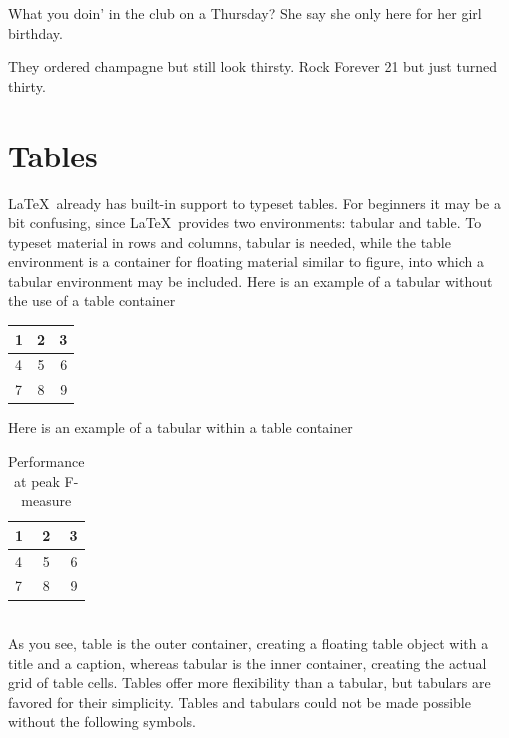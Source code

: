 \documentclass[12pt,journal,compsoc]{IEEEtran}
\begin{document}
What you doin' in the club on a Thursday?
She say she only here for her girl birthday. \par
They ordered champagne but still look thirsty.
Rock Forever 21 but just turned thirty.


\section{Tables}
\LaTeX\ already has built-in support to typeset tables.
For beginners it may be a bit confusing, since \LaTeX\
provides two environments: tabular and table. To
typeset material in rows and columns, tabular is
needed, while the table environment is a container
for floating material similar to figure, into which a
tabular environment may be included. Here is an example of a tabular without the use of a table container 

\begin{center}
  \begin{tabular}{ | l | c | r | }
    \hline
    1 & 2 & 3 \\ \hline
    4 & 5 & 6 \\ \hline
    7 & 8 & 9 \\ 
    \hline
  \end{tabular}
\end{center}

Here is an example of a tabular within a table container

\begin{table}[h]\footnotesize
  \caption{Performance at peak F-measure}
  \begin{center}
  \begin{tabular}{ | l | c | r | }
    \hline
    1 & 2 & 3 \\ \hline
    4 & 5 & 6 \\ \hline
    7 & 8 & 9 \\ 
    \hline
  \end{tabular}
\end{center}
\end{table} \\

As you see, table is the outer container, creating a floating table object with a title and a caption, whereas tabular is the inner container, creating the actual grid of table cells. Tables offer more flexibility than a tabular, but tabulars are  favored for their simplicity. Tables and tabulars could not be made possible without the following symbols.
\end{document}
